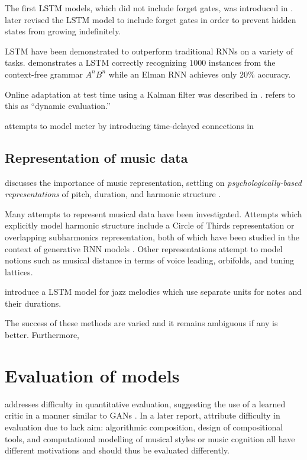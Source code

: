 The first LSTM models, which did not include forget gates, was introduced in
\cite{hochreiter1997long}. \cite{gers2000learning} later revised the LSTM model
to include forget gates in order to prevent hidden states from growing
indefinitely.

LSTM have been demonstrated to outperform traditional RNNs on a variety of
tasks. \cite{gers2001lstm} demonstrates a LSTM correctly recognizing $1000$
instances from the context-free grammar $A^n B^n$ while an Elman RNN achieves
only $20\%$ accuracy.

Online adaptation at test time using a Kalman filter was described in \cite{gers2002dekf}.
\cite{Mikolov2010} \cite{Mikolov2012} refers to this as ``dynamic evaluation.''

\cite{eck2008learning} attempts to model meter by introducing time-delayed
connections in \cite{Eck2002}

\subsection{Representation of music data}

\cite{mozer1994neural} discusses the importance of music representation,
settling on \emph{psychologically-based representations} of pitch, duration,
and harmonic structure \cite{shepard1982geometrical}.

Many attempts to represent musical data have been investigated. Attempts which
explicitly model harmonic structure include a Circle of Thirds representation
\cite{franklin2004recurrent} or overlapping subharmonics
representation\cite{laden1989representation}, both of which have been studied
in the context of generative RNN models \cite{franklin2004recurrent}
\cite{mozer1994neural}. Other representations attempt to model notions such as
musical distance in terms of voice leading, orbifolds, and tuning
lattices\cite{Tymoczko2009}.

\cite{franklin2005jazz} introduce a LSTM model for jazz melodies which use
separate units for notes and their durations.

The success of these methods are varied and it remains ambiguous if any
is better. Furthermore,

\section{Evaluation of models}

\cite{pearce2001towards} addresses difficulty in quantitative evaluation,
suggesting the use of a learned critic in a manner similar to GANs
\cite{goodfellow2014generative}. In a later report,
\cite{pearce2002motivations} attribute difficulty in evaluation due to lack
aim: algorithmic composition, design of compositional tools, and computational
modelling of musical styles or music cognition all have different motivations
and should thus be evaluated differently.

